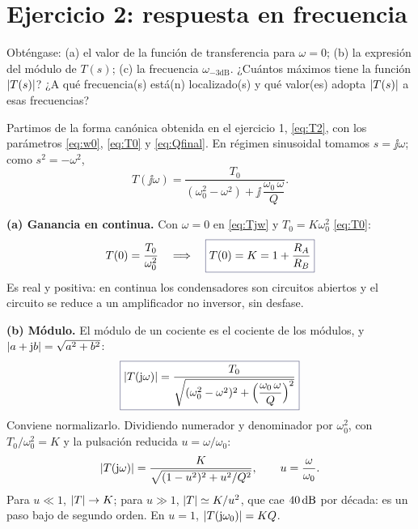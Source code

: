 \section{Ejercicio 2: respuesta en frecuencia}\label{sec:respuesta}
\begin{prelab}
Obténgase: (a) el valor de la función de transferencia para $\omega=0$; (b) la expresión del módulo de
$T(s)$; (c) la frecuencia $\omega_{-3\mathrm{dB}}$. ¿Cuántos máximos tiene la función $\lvert T(s)\rvert$? ¿A qué
frecuencia(s) está(n) localizado(s) y qué valor(es) adopta $\lvert T(s)\rvert$ a esas frecuencias?
\end{prelab}

\begin{resolucion}
Partimos de la forma canónica obtenida en el ejercicio 1, \eqref{eq:T2}, con los parámetros \eqref{eq:w0},
\eqref{eq:T0} y \eqref{eq:Qfinal}. En régimen sinusoidal tomamos $s=\jj\omega$; como $s^{2}=-\omega^{2}$,
\begin{equation}\label{eq:Tjw}
  T(\jj\omega)=\frac{T_0}{(\omega_0^{2}-\omega^{2})+\jj\,\dfrac{\omega_0\,\omega}{Q}} .
\end{equation}

\textbf{(a) Ganancia en continua.} Con $\omega=0$ en \eqref{eq:Tjw} y $T_0=K\omega_0^{2}$ \eqref{eq:T0}:
\begin{equation}\label{eq:T0dc}
  T(0)=\frac{T_0}{\omega_0^{2}}\quad\Longrightarrow\quad\resultado{T(0)=K=1+\frac{R_A}{R_B}}
\end{equation}
Es real y positiva: en continua los condensadores son circuitos abiertos y el circuito se reduce a un
amplificador no inversor, sin desfase.

\textbf{(b) Módulo.} El módulo de un cociente es el cociente de los módulos, y $\lvert a+\mathrm{j} b\rvert=\sqrt{a^{2}+b^{2}}$:
\begin{equation}\label{eq:mod}
  \resultado{\abs{T(\jj\omega)}=\frac{T_0}{\sqrt{(\omega_0^{2}-\omega^{2})^{2}+\Bigl(\dfrac{\omega_0\,\omega}{Q}\Bigr)^{2}}}}
\end{equation}
Conviene normalizarlo. Dividiendo numerador y denominador por $\omega_0^{2}$, con $T_0/\omega_0^{2}=K$ y la
pulsación reducida $u=\omega/\omega_0$:
\begin{equation}\label{eq:modn}
  \lvert T(\mathrm{j}\omega)\rvert=\frac{K}{\sqrt{(1-u^{2})^{2}+u^{2}/Q^{2}}},\qquad u=\frac{\omega}{\omega_0} .
\end{equation}
Para $u\ll1$, $\lvert T\rvert\to K$; para $u\gg1$, $\lvert T\rvert\simeq K/u^{2}$, que cae $40\,\mathrm{dB}$ por década: es un paso bajo de
segundo orden. En $u=1$, $\lvert T(\mathrm{j}\omega_0)\rvert=KQ$.


\end{resolucion}
